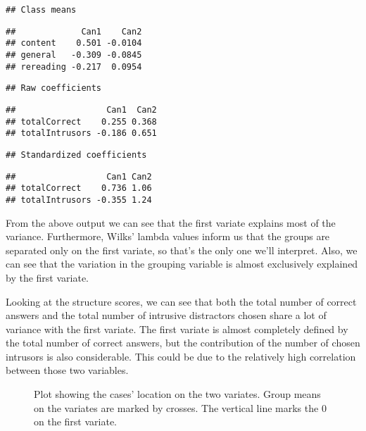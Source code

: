 \documentclass[11pt,]{article}
\begin{document}
\begin{verbatim}
## Class means
\end{verbatim}

\begin{verbatim}
##             Can1    Can2
## content    0.501 -0.0104
## general   -0.309 -0.0845
## rereading -0.217  0.0954
\end{verbatim}

\begin{verbatim}
## Raw coefficients
\end{verbatim}

\begin{verbatim}
##                  Can1  Can2
## totalCorrect    0.255 0.368
## totalIntrusors -0.186 0.651
\end{verbatim}

\begin{verbatim}
## Standardized coefficients
\end{verbatim}

\begin{verbatim}
##                  Can1 Can2
## totalCorrect    0.736 1.06
## totalIntrusors -0.355 1.24
\end{verbatim}

From the above output we can see that the first variate explains most of
the variance. Furthermore, Wilks' lambda values inform us that the
groups are separated only on the first variate, so that's the only one
we'll interpret. Also, we can see that the variation in the grouping
variable is almost exclusively explained by the first variate.

Looking at the structure scores, we can see that both the total number
of correct answers and the total number of intrusive distractors chosen
share a lot of variance with the first variate. The first variate is
almost completely defined by the total number of correct answers, but
the contribution of the number of chosen intrusors is also considerable.
This could be due to the relatively high correlation between those two
variables.

\begin{figure*}
\caption[\label{ldaPlot1}Plot showing the cases' location on the two variates]{\label{ldaPlot1}Plot showing the cases' location on the two variates. Group means on the variates are marked by crosses. The vertical line marks the 0 on the first variate.}\label{fig:ldaPlot}
\end{figure*}
\end{document}

